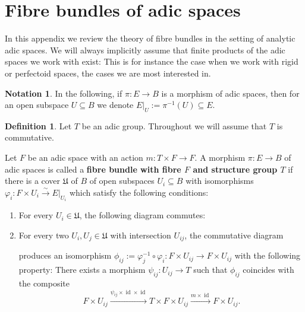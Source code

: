 \documentclass[10pt,oneside]{amsart}
\theoremstyle{definition}
\newtheorem{definition}[theorem]{Definition}
\newtheorem{notation}[theorem]{Notation}
\begin{document}
	
		\appendix
	\section{Fibre bundles of adic spaces}\label{s:appendix}
	In this appendix we review the theory of fibre bundles in the setting of analytic adic spaces. We will always implicitly assume that finite products of the adic spaces we work with exist: This is for instance the case when we work with rigid or perfectoid spaces, the cases we are most interested in.

	\begin{notation}
		In the following, if $\pi\colon E\rightarrow B$ is a morphism of adic spaces, then for an open subspace $U\subseteq B$ we denote $E|_U:=\pi^{-1}(U)\subseteq E$.
	\end{notation}
	\begin{definition}\label{definition principal T-bundle}
		Let $T$ be an adic group. Throughout we will assume that $T$ is commutative. 
		
		Let $F$ be an adic space with an action $m\colon T\times F\rightarrow F$.
		A morphism $\pi\colon E\rightarrow B$ of adic spaces is called a \textbf{fibre bundle with fibre $F$ and structure group $T$} if there is a cover $\mathfrak U$ of $B$ of open subspaces $U_i\subseteq B$ with isomorphisms $\varphi_i:F\times U_i \xrightarrow{\sim} E|_{U_i}$ which satisfy the following conditions:
		\begin{enumerate}[label=(\alph*)]
			\item For every $U_i\in \mathfrak U$, the following diagram commutes:
			\begin{center}
			\end{center}
			\item For every two $U_i,U_j\in \mathfrak U$ with intersection $U_{ij}$, the commutative diagram
			\begin{center}
			\end{center}
			produces an isomorphism $\phi_{ij}:=\varphi_j^{-1}\circ\varphi_i\colon F\times U_{ij}\rightarrow F\times U_{ij}$ with the following property: There exists a morphism $\psi_{ij}:U_{ij}\rightarrow T$ such that $\phi_{ij}$ coincides with the composite
			\[F\times U_{ij} \xrightarrow{\psi_{ij}\times \operatorname{id}\times\operatorname{id}} T\times F\times U_{ij}\xrightarrow{m\times \operatorname{id}} F\times U_{ij}.\]
		\end{enumerate}
	\end{definition}
\end{document}
